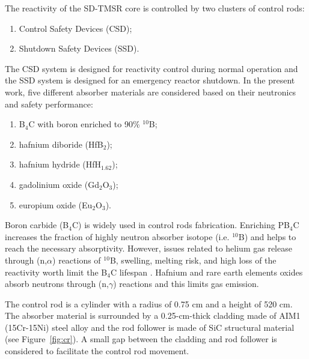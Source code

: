 The reactivity of the SD-TMSR core is controlled by two clusters of control 
rods:
\begin{enumerate}
\item Control Safety Devices (CSD);
\item Shutdown Safety Devices (SSD).
\end{enumerate}
The CSD system is designed for reactivity control during normal operation and the SSD system is designed for an emergency reactor shutdown.
In the present work, five different absorber materials are considered based on their neutronics and safety performance:
\begin{enumerate}
\item B$_4$C with boron enriched to 90\% $^{10}$B;
\item hafnium diboride (HfB$_2$);
\item hafnium hydride (HfH$_{1.62}$);
\item gadolinium oxide (Gd$_2$O$_3$);
\item europium oxide (Eu$_2$O$_3$).
\end{enumerate}
Boron carbide (B$_4$C) is widely used in control rods fabrication. Enriching 
PB$_4$C increases the fraction of highly neutron absorber isotope (i.e. 
$^{10}$B) and helps to reach the necessary absorptivity. However, issues 
related to helium gas release through (n,$\alpha$) reactions of $^{10}$B, 
swelling, melting risk, and high loss of the reactivity worth limit the B$_4$C 
lifespan \cite{guo2019optimized}. Hafnium and rare earth elements oxides 
absorb neutrons through (n,$\gamma$) reactions and this limits gas emission.

The control rod is a cylinder with a radius of 0.75 cm and a height of 520 cm. 
The absorber material is surrounded by a 0.25-cm-thick cladding made of AIM1 
(15Cr-15Ni) steel alloy \cite{SERAN2017285} and the rod follower is made of 
SiC structural material (see Figure~\ref{fig:cr}). A small gap between the 
cladding and rod follower is considered to facilitate the control rod movement.

